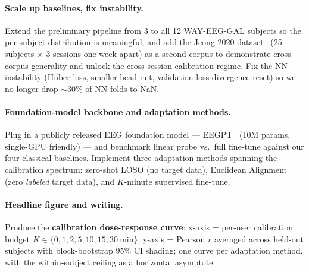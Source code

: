 \documentclass{article}
\begin{document}
\paragraph{Scale up baselines, fix instability.} Extend the preliminary pipeline from 3 to all 12 WAY-EEG-GAL subjects so the per-subject distribution is meaningful, and add the Jeong 2020 dataset~\cite{jeong2020} (25 subjects $\times$ 3 sessions one week apart) as a second corpus to demonstrate cross-corpus generality and unlock the cross-session calibration regime. Fix the NN instability (Huber loss, smaller head init, validation-loss divergence reset) so we no longer drop $\sim$30\% of NN folds to NaN.

\paragraph{Foundation-model backbone and adaptation methods.} Plug in a publicly released EEG foundation model --- EEGPT~\cite{eegpt} (10M params, single-GPU friendly) --- and benchmark linear probe vs.\ full fine-tune against our four classical baselines. Implement three adaptation methods spanning the calibration spectrum: zero-shot LOSO (no target data), Euclidean Alignment~\cite{he2020ea} (zero \emph{labeled} target data), and $K$-minute supervised fine-tune. 

\paragraph{Headline figure and writing.} Produce the \textbf{calibration dose-response curve}: x-axis = per-user calibration budget $K \in \{0, 1, 2, 5, 10, 15, 30~\text{min}\}$; y-axis = Pearson $r$ averaged across held-out subjects with block-bootstrap 95\% CI shading; one curve per adaptation method, with the within-subject ceiling as a horizontal asymptote.

\end{document}
